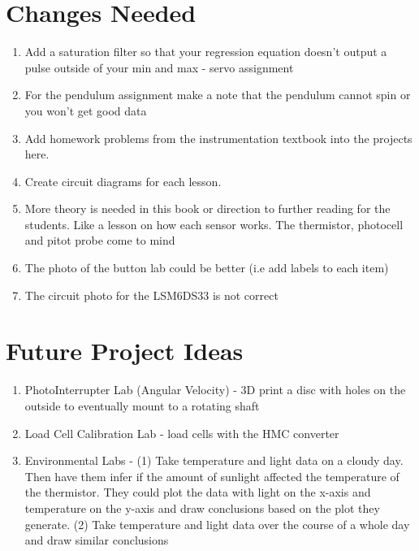 \section{Changes Needed}
\begin{enumerate}[itemsep=-5pt]
\item Add a saturation filter so that your regression equation doesn't output a pulse outside of your min and max - servo assignment
\item For the pendulum assignment make a note that the pendulum cannot spin or you won't get good data
\item Add homework problems from the instrumentation textbook into the projects here. 
\item Create circuit diagrams for each lesson.
\item More theory is needed in this book or direction to further
  reading for the students. Like a lesson on how each sensor works. The thermistor, photocell and pitot probe come to mind
\item The photo of the button lab could be better (i.e add labels to
  each item)
\item The circuit photo for the LSM6DS33 is not correct
\end{enumerate}

\section{Future Project Ideas}
\begin{enumerate}[itemsep=-5pt]
\item PhotoInterrupter Lab (Angular Velocity) - 3D print a disc with holes on the outside to eventually mount to a rotating shaft  
\item Load Cell Calibration Lab - load cells with the HMC converter
\item Environmental Labs - (1) Take temperature and light data on a cloudy day. Then have them infer if the amount of sunlight affected the temperature of the thermistor. They could plot the data with light on the x-axis and temperature on the y-axis and draw conclusions based on the plot they generate. (2) Take temperature and light data over the course of a whole day and draw similar conclusions
\end{enumerate}
